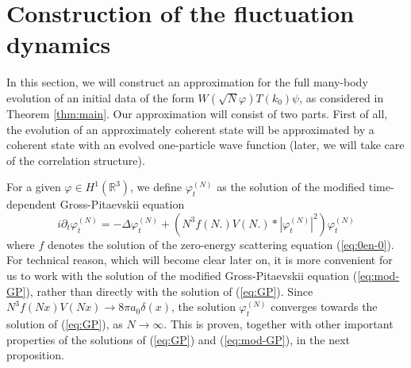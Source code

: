 \documentclass[11pt,a4paper]{article}
\newcommand{\bR}{{\mathbb R}}
\begin{document}
\section{Construction of the fluctuation dynamics}

In this section, we will construct an approximation for the full many-body evolution of an initial data of the form $W(\sqrt{N} \varphi) T(k_0) \psi$, as considered in Theorem \ref{thm:main}. 
Our approximation will consist of two parts. First of all, the evolution of an approximately coherent state will be approximated by a coherent state with an evolved one-particle wave function (later, we will take care of the correlation structure). 

For a given $\varphi \in H^1 (\bR^3)$, we define $\varphi^{(N)}_t$ as the solution of the modified time-dependent Gross-Pitaevskii equation
\begin{equation}\label{eq:mod-GP} i\partial_t \varphi_t^{(N)} = - \Delta \varphi_t^{(N)} + \left( N^3 f(N.) V(N.) * |\varphi^{(N)}_t|^2 \right) \varphi_t^{(N)} \end{equation}
where $f$ denotes the solution of the zero-energy scattering equation (\ref{eq:0en-0}). 
For technical reason, which will become clear later on, it is more convenient for us to work with the solution of the modified Gross-Pitaevskii equation (\ref{eq:mod-GP}), rather than directly with the solution of (\ref{eq:GP}). Since $N^3 f(Nx) V(Nx) \to 8 \pi a_0 \delta (x)$, the solution $\varphi_t^{(N)}$ converges towards the solution of (\ref{eq:GP}), as $N \to \infty$. This is proven, together with other important properties of the solutions of (\ref{eq:GP}) and (\ref{eq:mod-GP}), in the next proposition. 
\end{document}

